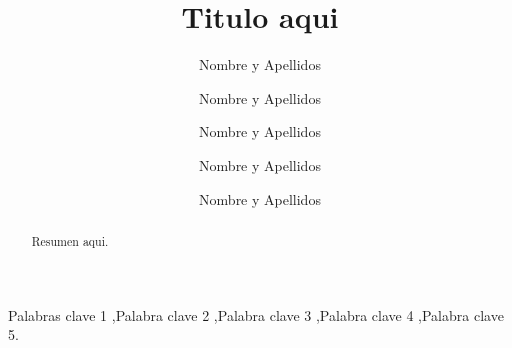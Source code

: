 \documentclass[5p]{elsarticle}
\begin{document}
\begin{frontmatter}
    






\title{Titulo aqui}



\author[First]{Nombre y Apellidos}

\author[First]{Nombre y Apellidos}

\author[First]{Nombre y Apellidos}

\author[First]{Nombre y Apellidos}

\author[First]{Nombre y Apellidos}


\address[First]{Universidad Nacional de San Agust{\'i}n, Arequipa, Per{\'u}.}

\begin{abstract}
Resumen aqui.
\end{abstract}

\begin{keyword}


Palabras clave 1 \sep Palabra clave 2 \sep Palabra clave 3 \sep Palabra clave 4 \sep Palabra clave 5.
\end{keyword}


\end{frontmatter}
\end{document}
